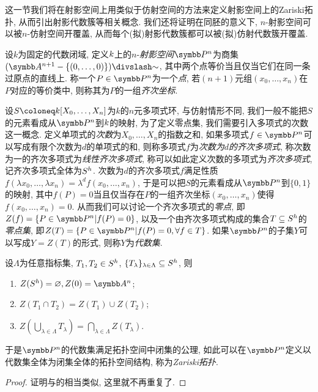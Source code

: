 这一节我们将在射影空间上用类似于仿射空间的方法来定义射影空间上的Zariski拓扑, 从而引出射影代数簇等相关概念. 我们还将证明在同胚的意义下, $n$-射影空间可以被$n$-仿射空间开覆盖, 从而每个(拟)射影代数簇都可以被(拟)仿射代数簇开覆盖.

设$k$为固定的代数闭域, 定义$k$上的$n$-\emph{射影空间}$\PP^n$为商集$(\AF^{n+1}-\{(0, \dotsc, 0)\}){\divslash}{\sim}$, 其中两个点等价当且仅当它们在同一条过原点的直线上. 称一个$P\in\PP^n$为一个\emph{点}, 若$(n+1)$元组$(x_0, \dotsc, x_n)$在$P$对应的等价类中, 则称其为$P$的一组\emph{齐次坐标}.

设$S\coloneq \kk [X_0, \dotsc, X_n]$为$k$的$n$元多项式环, 与仿射情形不同, 我们一般不能把$S$的元素看成从$\PP^n$到$k$的映射, 为了定义零点集, 我们需要引入多项式的次数这一概念. 定义单项式的\emph{次数}为$X_0, \dotsc, X_n$的指数之和, 如果多项式$f\in \PP^n$可以写成有限个次数为$d$的单项式的和, 则称多项式$f$为\emph{次数为$d$的齐次多项式}, 称次数为一的齐次多项式为\emph{线性齐次多项式}, 称可以如此定义次数的多项式为\emph{齐次多项式}, 记齐次多项式全体为$S^h$. 次数为$d$的齐次多项式$f$满足性质$f(\lambda x_0, \dotsc, \lambda x_n)=\lambda^d f(x_0, \dotsc, x_n)$, 于是可以把$S$的元素看成从$\PP^n$到$\{0, 1\}$的映射, 其中$f(P)=0$当且仅当存在$P$的一组齐次坐标$(x_0, \dotsc, x_n)$使得$f(x_0, \dotsc, x_n)=0$. 从而我们可以讨论一个齐次多项式的\emph{零点}, 即$Z(f)=\{P\in \PP^n\vert f(P)=0\}$, 以及一个由齐次多项式构成的集合$T\subseteq S^h$的\emph{零点集}, 即$Z(T)=\{P\in\PP^n\vert f(P)=0, \forall f\in T\}$. 如果$\PP^n$的子集$Y$可以写成$Y=Z(T)$的形式, 则称$Y$为\emph{代数集}.

\begin{proposition}
    设$\Lambda$为任意指标集, $T_1, T_2\in S^h$, $\{T_\lambda\}_{\lambda\in\Lambda}\subseteq S^h$, 则
    \begin{enumerate}
        \item $Z(\Shomo)=\varnothing, Z(0)=\AF^n$;
        \item $Z(T_1\cap T_2)=Z(T_1)\cup Z(T_2)$;
        \item $Z(\bigcup_{\lambda\in\Lambda} T_\lambda)=\bigcap_{\lambda\in\Lambda} Z(T_\lambda)$.
    \end{enumerate}
    于是$\PP^n$的代数集满足拓扑空间中闭集的公理, 如此可以在$\PP^n$定义以代数集全体为闭集全体的拓扑空间结构, 称为\emph{Zariski拓扑}.
\end{proposition}

\begin{proof}
    证明与的相当类似, 这里就不再重复了.
\end{proof}

